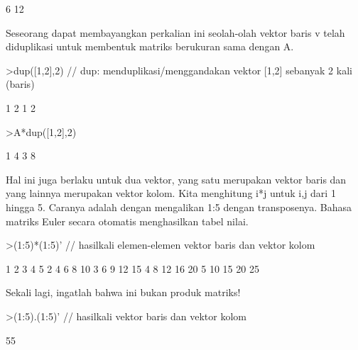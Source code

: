 \documentclass[a4paper,10pt]{article}
\begin{document}
\begin{eulernotebook}
\begin{eulercomment}
\begin{eulercomment}
\begin{eulercomment}
\begin{eulercomment}
\begin{eulercomment}
\begin{eulercomment}
\begin{euleroutput}
              6            12 
\end{euleroutput}
\begin{eulercomment}
Seseorang dapat membayangkan perkalian ini seolah-olah vektor baris v
telah diduplikasi untuk membentuk matriks berukuran sama dengan A.
\end{eulercomment}
\begin{eulerprompt}
>dup([1,2],2) // dup: menduplikasi/menggandakan vektor [1,2] sebanyak 2 kali (baris)
\end{eulerprompt}
\begin{euleroutput}
              1             2 
              1             2 
\end{euleroutput}
\begin{eulerprompt}
>A*dup([1,2],2) 
\end{eulerprompt}
\begin{euleroutput}
              1             4 
              3             8 
\end{euleroutput}
\begin{eulercomment}
Hal ini juga berlaku untuk dua vektor, yang satu merupakan vektor
baris dan yang lainnya merupakan vektor kolom. Kita menghitung i*j
untuk i,j dari 1 hingga 5. Caranya adalah dengan mengalikan 1:5 dengan
transposenya. Bahasa matriks Euler secara otomatis menghasilkan tabel
nilai.
\end{eulercomment}
\begin{eulerprompt}
>(1:5)*(1:5)' // hasilkali elemen-elemen vektor baris dan vektor kolom
\end{eulerprompt}
\begin{euleroutput}
              1             2             3             4             5 
              2             4             6             8            10 
              3             6             9            12            15 
              4             8            12            16            20 
              5            10            15            20            25 
\end{euleroutput}
\begin{eulercomment}
Sekali lagi, ingatlah bahwa ini bukan produk matriks!
\end{eulercomment}
\begin{eulerprompt}
>(1:5).(1:5)' // hasilkali vektor baris dan vektor kolom
\end{eulerprompt}
\begin{euleroutput}
  55
\end{euleroutput}
\begin{eulerprompt}

\end{eulerprompt}
\end{eulercomment}
\end{eulercomment}
\end{eulercomment}
\end{eulercomment}
\end{eulercomment}
\end{eulercomment}
\end{eulernotebook}
\end{document}
